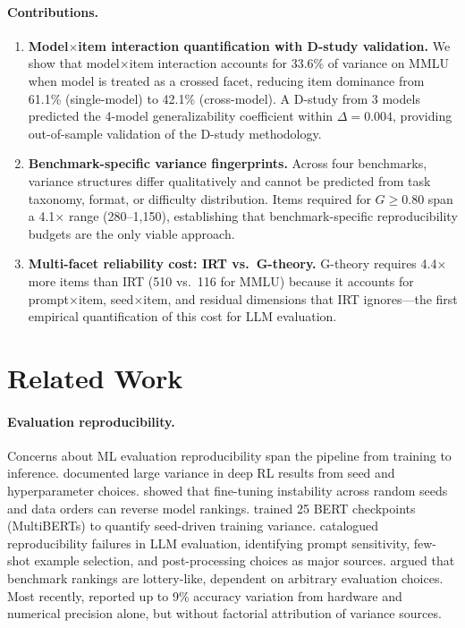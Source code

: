 \documentclass[11pt]{article}
\begin{document}
\paragraph{Contributions.}
\begin{enumerate}[leftmargin=*,topsep=2pt,itemsep=1pt]
  \item \textbf{Model$\times$item interaction quantification with D-study validation.} We show that model$\times$item interaction accounts for 33.6\% of variance on MMLU when model is treated as a crossed facet, reducing item dominance from 61.1\% (single-model) to 42.1\% (cross-model). A D-study from 3 models predicted the 4-model generalizability coefficient within $\Delta = 0.004$, providing out-of-sample validation of the D-study methodology.
  \item \textbf{Benchmark-specific variance fingerprints.} Across four benchmarks, variance structures differ qualitatively and cannot be predicted from task taxonomy, format, or difficulty distribution. Items required for $G \geq 0.80$ span a 4.1$\times$ range (280--1{,}150), establishing that benchmark-specific reproducibility budgets are the only viable approach.
  \item \textbf{Multi-facet reliability cost: IRT vs.\ G-theory.} G-theory requires 4.4$\times$ more items than IRT (510 vs.\ 116 for MMLU) because it accounts for prompt$\times$item, seed$\times$item, and residual dimensions that IRT ignores---the first empirical quantification of this cost for LLM evaluation.
\end{enumerate}

\section{Related Work}

\paragraph{Evaluation reproducibility.}
Concerns about ML evaluation reproducibility span the pipeline from training to inference.
\citet{henderson2018} documented large variance in deep RL results from seed and hyperparameter choices.
\citet{dodge2020} showed that fine-tuning instability across random seeds and data orders can reverse model rankings.
\citet{sellam2022} trained 25 BERT checkpoints (MultiBERTs) to quantify seed-driven training variance.
\citet{biderman2024} catalogued reproducibility failures in LLM evaluation, identifying prompt sensitivity, few-shot example selection, and post-processing choices as major sources.
\citet{dehghani2021} argued that benchmark rankings are lottery-like, dependent on arbitrary evaluation choices.
Most recently, \citet{yuan2025} reported up to 9\% accuracy variation from hardware and numerical precision alone, but without factorial attribution of variance sources.
\end{document}
